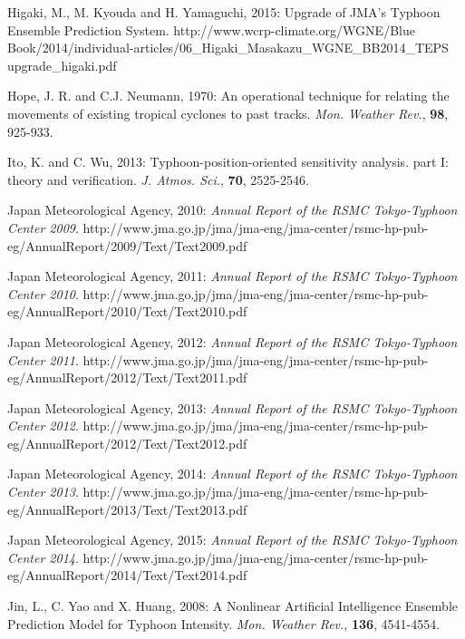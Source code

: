 \documentclass[a4paper, 12pt]{article}
\begin{document}
{\begin{list}{}{\leftmargin=1em \itemindent=-2em}
\item Higaki, M., M. Kyouda and H. Yamaguchi, 2015: Upgrade of JMA's Typhoon Ensemble Prediction System. http://www.wcrp-climate.org/WGNE/Blue Book/2014/individual-articles/06\_Higaki\_Masakazu\_WGNE\_BB2014\_TEPS upgrade\_higaki.pdf


\item Hope, J. R. and C.J. Neumann, 1970: An operational technique for relating the movements of existing tropical cyclones to past tracks. \emph{Mon. Weather Rev.}, {\bf 98}, 925-933.


    \item Ito, K. and C. Wu, 2013: Typhoon-position-oriented sensitivity analysis. part I: theory and verification. \emph{J. Atmos. Sci.}, {\bf 70}, 2525-2546.

\item Japan Meteorological Agency, 2010: {\em Annual Report of the RSMC Tokyo-Typhoon Center 2009}. http://www.jma.go.jp/jma/jma-eng/jma-center/rsmc-hp-pub-eg/AnnualReport/2009/Text/Text2009.pdf

\item Japan Meteorological Agency, 2011: {\em Annual Report of the RSMC Tokyo-Typhoon Center 2010}. http://www.jma.go.jp/jma/jma-eng/jma-center/rsmc-hp-pub-eg/AnnualReport/2010/Text/Text2010.pdf

\item Japan Meteorological Agency, 2012: {\em Annual Report of the RSMC Tokyo-Typhoon Center 2011}. http://www.jma.go.jp/jma/jma-eng/jma-center/rsmc-hp-pub-eg/AnnualReport/2012/Text/Text2011.pdf

\item Japan Meteorological Agency, 2013: {\em Annual Report of the RSMC Tokyo-Typhoon Center 2012}. http://www.jma.go.jp/jma/jma-eng/jma-center/rsmc-hp-pub-eg/AnnualReport/2012/Text/Text2012.pdf

\item Japan Meteorological Agency, 2014: {\em Annual Report of the RSMC Tokyo-Typhoon Center 2013}. http://www.jma.go.jp/jma/jma-eng/jma-center/rsmc-hp-pub-eg/AnnualReport/2013/Text/Text2013.pdf

\item Japan Meteorological Agency, 2015: {\em Annual Report of the RSMC Tokyo-Typhoon Center 2014}. http://www.jma.go.jp/jma/jma-eng/jma-center/rsmc-hp-pub-eg/AnnualReport/2014/Text/Text2014.pdf


\item Jin, L., C. Yao and X. Huang, 2008: A Nonlinear Artificial Intelligence Ensemble Prediction Model for Typhoon Intensity. \emph{Mon. Weather Rev.}, {\bf 136}, 4541-4554.


\end{list}}
\end{document}
